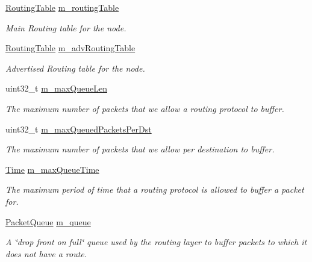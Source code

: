 \begin{DoxyCompactItemize}
\hyperlink{classns3_1_1dsdv_1_1RoutingTable}{Routing\+Table} \hyperlink{classns3_1_1dsdv_1_1RoutingProtocol_acc4cee466c2591e35f508ce58097a00e}{m\+\_\+routing\+Table}
\begin{DoxyCompactList}\small\item\em Main Routing table for the node. \end{DoxyCompactList}\item 
\hyperlink{classns3_1_1dsdv_1_1RoutingTable}{Routing\+Table} \hyperlink{classns3_1_1dsdv_1_1RoutingProtocol_adce3cf63777d6099e58caa1cb198282c}{m\+\_\+adv\+Routing\+Table}
\begin{DoxyCompactList}\small\item\em Advertised Routing table for the node. \end{DoxyCompactList}\item 
uint32\+\_\+t \hyperlink{classns3_1_1dsdv_1_1RoutingProtocol_aedf19d36f43f8c0bed80d22b2eec343c}{m\+\_\+max\+Queue\+Len}
\begin{DoxyCompactList}\small\item\em The maximum number of packets that we allow a routing protocol to buffer. \end{DoxyCompactList}\item 
uint32\+\_\+t \hyperlink{classns3_1_1dsdv_1_1RoutingProtocol_a2bfab14f96b69300b5b86aeaca2b6f64}{m\+\_\+max\+Queued\+Packets\+Per\+Dst}
\begin{DoxyCompactList}\small\item\em The maximum number of packets that we allow per destination to buffer. \end{DoxyCompactList}\item 
\hyperlink{classns3_1_1Time}{Time} \hyperlink{classns3_1_1dsdv_1_1RoutingProtocol_a99d9a7c27e476c4f0a2c93f889ab8e13}{m\+\_\+max\+Queue\+Time}
\begin{DoxyCompactList}\small\item\em The maximum period of time that a routing protocol is allowed to buffer a packet for. \end{DoxyCompactList}\item 
\hyperlink{classns3_1_1dsdv_1_1PacketQueue}{Packet\+Queue} \hyperlink{classns3_1_1dsdv_1_1RoutingProtocol_a3ed623ade7d7244ed1ff5e0f6a399a68}{m\+\_\+queue}
\begin{DoxyCompactList}\small\item\em A \char`\"{}drop front on full\char`\"{} queue used by the routing layer to buffer packets to which it does not have a route. \end{DoxyCompactList}\item 

\end{DoxyCompactItemize}
